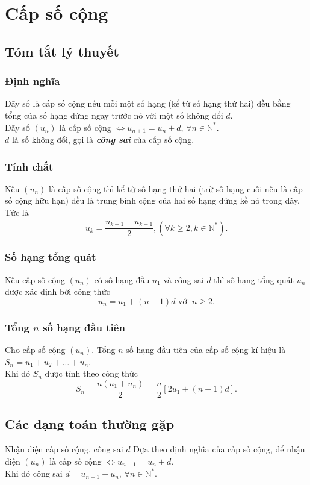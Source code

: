 \setcounter{section}{5}
\setcounter{dang}{0}
\setcounter{ex}{0}
\setcounter{bt}{0}
\setcounter{vd}{0}
\section{Cấp số cộng}
\subsection{Tóm tắt lý thuyết}
\begin{tomtat}
	\subsubsection{Định nghĩa}
	Dãy số là cấp số cộng nếu mỗi một số hạng (kể từ số hạng thứ hai) đều bằng tổng của số hạng đứng ngay trước nó với một số không đổi $ d $.\\
	Dãy số $ (u_n) $ là cấp số cộng $ \Leftrightarrow u_{n+1}=u_n+d $, $ \forall n \in \mathbb{N}^* $.\\
	$ d $ là số không đổi, gọi là \textbf{\textit{công sai}} của cấp số cộng.
	\subsubsection{Tính chất}
	Nếu $ (u_n) $ là cấp số cộng thì kể từ số hạng thứ hai (trừ số hạng cuối nếu là cấp số cộng hữu hạn) đều là trung bình cộng của hai số hạng đứng kề nó trong dãy. Tức là $$u_k=\dfrac{u_{k-1}+u_{k+1}}{2}, (\forall k\ge 2, k \in \mathbb{N}^*).$$
	\subsubsection{Số hạng tổng quát}
	Nếu cấp số cộng $ (u_n) $ có số hạng đầu $ u_1 $ và công sai $ d $ thì số hạng tổng quát $ u_n $ được xác định bởi công thức $$u_n=u_1+(n-1)d \text{ với $n\ge 2$}.$$
	\subsubsection{Tổng $ n $ số hạng đầu tiên}
	Cho cấp số cộng $ (u_n) $. Tổng $ n $ số hạng đầu tiên của cấp số cộng kí hiệu là $ S_n=u_1+u_2+\ldots+u_n $.\\
	Khi đó $ S_n $ được tính theo công thức $$ S_n=\dfrac{n(u_1+u_n)}{2}=\dfrac{n}{2}\left[ 2u_1+(n-1)d\right]. $$
\end{tomtat}
\subsection{Các dạng toán thường gặp}
\begin{dang}{Nhận diện cấp số cộng, công sai $ d $}
	Dựa theo định nghĩa của cấp số cộng, để nhận diện $ (u_n) $ là cấp số cộng $ \Leftrightarrow u_{n+1}=u_n+d $.\\
	Khi đó công sai $ d=u_{n+1}-u_{n} $, $ \forall n \in \mathbb{N}^* $.
\end{dang}
